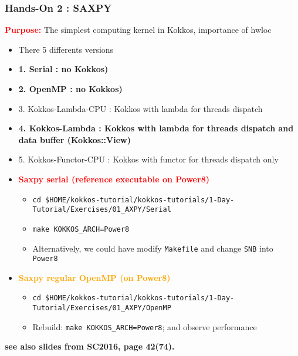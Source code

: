 \begin{frame}[fragile=singleslide]
  \frametitle{Hands-On 2 : SAXPY}

  {\large \textcolor{red}{\textbf{Purpose:}} The simplest computing kernel in Kokkos, importance of hwloc}

  \begin{itemize}
  \item There 5 differents versions
  \item \textbf{1. Serial : no Kokkos)}
  \item \textbf{2. OpenMP : no Kokkos)}
  \item 3. Kokkos-Lambda-CPU : Kokkos with lambda for threads dispatch
  \item \textbf{4. Kokkos-Lambda : Kokkos with lambda for threads dispatch and data buffer (Kokkos::View)}
  \item 5. Kokkos-Functor-CPU : Kokkos with functor for threads dispatch only
  \end{itemize}
  
  \begin{itemize}
  \item \textcolor{red}{\textbf{Saxpy serial (reference executable on Power8)}}
    \begin{itemize}
    \item \texttt{cd \$HOME/kokkos-tutorial/kokkos-tutorials/1-Day-Tutorial/Exercises/01\_AXPY/Serial}
    \item \texttt{make KOKKOS\_ARCH=Power8}
    \item Alternatively, we could have modify \texttt{Makefile} and change \texttt{SNB} into \texttt{Power8}
    \end{itemize}
  \item \textcolor{orange}{\textbf{Saxpy regular OpenMP (on Power8)}}
    \begin{itemize}
    \item \texttt{cd \$HOME/kokkos-tutorial/kokkos-tutorials/1-Day-Tutorial/Exercises/01\_AXPY/OpenMP}
    \item Rebuild: \texttt{make KOKKOS\_ARCH=Power8}; and observe performance
    \end{itemize}
  \end{itemize}

  \textbf{see also slides from SC2016, page 42(74).}
  
\end{frame}

